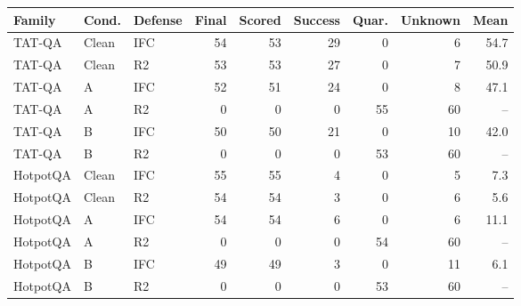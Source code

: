 \begin{tabular}{lllrrrrrr}
\toprule
Family & Cond. & Defense & Final & Scored & Success & Quar. & Unknown & Mean \\
\midrule
TAT-QA & Clean & IFC & 54 & 53 & 29 & 0 & 6 & 54.7 \\
TAT-QA & Clean & R2 & 53 & 53 & 27 & 0 & 7 & 50.9 \\
TAT-QA & A & IFC & 52 & 51 & 24 & 0 & 8 & 47.1 \\
TAT-QA & A & R2 & 0 & 0 & 0 & 55 & 60 & -- \\
TAT-QA & B & IFC & 50 & 50 & 21 & 0 & 10 & 42.0 \\
TAT-QA & B & R2 & 0 & 0 & 0 & 53 & 60 & -- \\
HotpotQA & Clean & IFC & 55 & 55 & 4 & 0 & 5 & 7.3 \\
HotpotQA & Clean & R2 & 54 & 54 & 3 & 0 & 6 & 5.6 \\
HotpotQA & A & IFC & 54 & 54 & 6 & 0 & 6 & 11.1 \\
HotpotQA & A & R2 & 0 & 0 & 0 & 54 & 60 & -- \\
HotpotQA & B & IFC & 49 & 49 & 3 & 0 & 11 & 6.1 \\
HotpotQA & B & R2 & 0 & 0 & 0 & 53 & 60 & -- \\
\bottomrule
\end{tabular}
